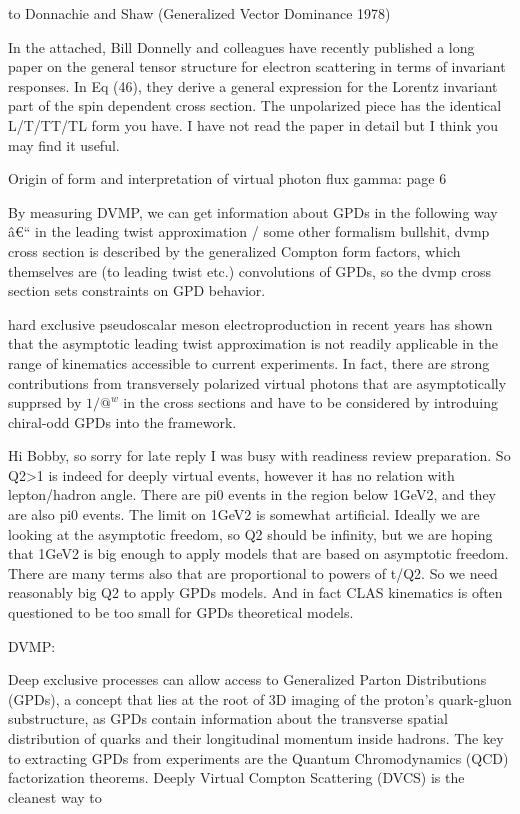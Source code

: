 to Donnachie and Shaw (Generalized Vector Dominance 1978) \cite{Donnachie1978GeneralizedDominance}


In the attached, Bill Donnelly and colleagues have recently published a long paper
on the general tensor structure for electron scattering in terms of invariant responses.
In Eq (46), they derive a general expression for the Lorentz invariant part of the spin \cite{Donnelly2023GeneralResponses}
dependent cross section.  The unpolarized piece has the identical L/T/TT/TL form you have.
I have not read the paper in detail but I think you may find it useful.



Origin of form and interpretation of virtual photon flux gamma: \cite{Amaldi1979Pion-electroproduction} page 6


By measuring DVMP, we can get information about GPDs in the following way â€“ in the leading twist approximation / some other formalism bullshit, dvmp cross section is described by the generalized Compton form factors, which themselves are (to leading twist etc.) convolutions of GPDs, so the dvmp cross section sets constraints on GPD behavior.

  hard exclusive pseudoscalar meson electroproduction in recent years has shown that the asymptotic leading twist approximation is not readily applicable in the range of kinematics accessible to current experiments. In fact, there are strong contributions from transversely polarized virtual photons that are asymptotically supprsed by $1/@^w$ in the cross sections and have to be considered by introduing chiral-odd GPDs into the framework.   



Hi Bobby, so sorry for late reply I was busy with readiness review preparation.
So Q2>1 is indeed for deeply virtual events, however it has no relation with lepton/hadron angle. There are pi0 events in the region below 1GeV2, and they are also pi0 events. The limit on 1GeV2 is somewhat artificial. Ideally we are looking at the asymptotic freedom, so Q2 should be infinity, but we are hoping that 1GeV2 is big enough to apply models that are based on asymptotic freedom. There are many terms also that are proportional to powers of t/Q2. So we need reasonably big Q2 to apply GPDs models. And in fact CLAS kinematics is often questioned to be too small for GPDs theoretical models.


    DVMP:

    Deep exclusive processes can allow access to Generalized Parton Distributions (GPDs), a concept that lies at the root of 3D imaging of the proton's quark-gluon substructure, as GPDs contain information about the transverse spatial distribution of quarks and their longitudinal momentum inside hadrons. The key to extracting GPDs from experiments are the Quantum Chromodynamics (QCD) factorization theorems. Deeply Virtual Compton Scattering (DVCS) is the cleanest way to
    
